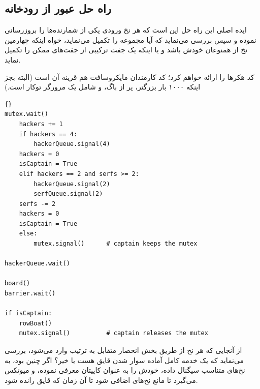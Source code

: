 \documentclass{book}
\newcommand{\clearemptydoublepage}{\newpage\cleardoublepage}
\begin{document}
\clearemptydoublepage
\subsection {راه حل عبور از رودخانه}

    ایده اصلی این راه حل این است که هر نخ ورودی یکی از شمارنده‌ها را بروزرسانی نموده و سپس بررسی می‌نماید که آیا مجموعه را تکمیل می‌نماید، خواه 
    اینکه چهارمین نخ از همنوعان خودش باشد و یا اینکه یک جفت ترکیبی از جفت‌‌های ممکن را تکمیل نماید. 

    کد هکرها را ارائه خواهم کرد؛ کد کارمندان مایکروسافت هم قرینه آن است (البته بجز اینکه ۱۰۰۰ بار بزرگتر، پر از باگ، و شامل یک مرورگر توکار است.)

\begin{latin}
\begin{latin}
\begin{lstlisting}[title=\rl{راه حل عبور از رودخانه}]{}
mutex.wait()
    hackers += 1
    if hackers == 4:
        hackerQueue.signal(4)                
	hackers = 0
	isCaptain = True
    elif hackers == 2 and serfs >= 2:
        hackerQueue.signal(2)                
        serfQueue.signal(2)                  
	serfs -= 2
	hackers = 0
	isCaptain = True
    else:
        mutex.signal()      # captain keeps the mutex

hackerQueue.wait()           

board()
barrier.wait()            

if isCaptain:
    rowBoat()
    mutex.signal()          # captain releases the mutex
\end{lstlisting}
\end{latin}
\end{latin}

    از آنجایی که هر نخ از طریق بخش انحصار متقابل به ترتیب وارد می‌شود، 
    بررسی می‌نماید که یک خدمه کامل آماده سوار شدن قایق هست یا خیر؟ اگر چنین بود، به نخ‌های متناسب سیگنال داده، خودش را به عنوان کاپیتان 
    معرفی نموده، و میوتکس می‌گیرد تا مانع نخ‌های اضافی شود تا آن زمان که قایق رانده شود. 
\end{document}

